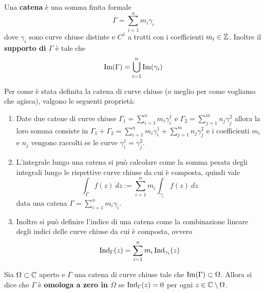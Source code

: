 \begin{definition}
    \label{def:catena-di-curve-chiuse}
    Una \textbf{catena} è una somma finita formale 
    \begin{equation*}
      \Gamma = \sum^n_{i=1} m_i \gamma_i
    \end{equation*}
    dove $\gamma_i$ sono curve chiuse distinte e $C^1$ a tratti con
    i coefficienti $m_i \in \mathbb{Z}$. Inoltre il \textbf{supporto di $\Gamma$}
    è tale che 
    \begin{equation*}
      \operatorname{Im}(\Gamma) = \bigcup^n_{i=1} \operatorname{Im}(\gamma_i)
    \end{equation*}
\end{definition}

\begin{remark}
  Per come è stata definita la catena di curve chiuse (o meglio per come vogliamo
  che agisca), valgono le seguenti proprietà:
  \begin{enumerate}
    \item Date due catene di curve chiuse $\Gamma_1 = \sum^n_{i=1} m_i
      \gamma^1_i$ e $\Gamma_2 = \sum^m_{j=1} n_j \gamma^2_j$ allora la loro
      somma consiste in $\Gamma_1 + \Gamma_2 =  \sum^n_{i=1} m_i
      \gamma^1_i + \sum^m_{j=1} n_j \gamma^2_j$ e i coefficienti $m_i$
      e $n_j$ vengono raccolti se le curve $\gamma^1_i = \gamma^2_j$.
    \item L'integrale lungo una catena si può calcolare come la somma pesata
      degli integrali lungo le rispettive curve chiuse da cui è composta,
      quindi vale 
      \begin{equation*}
        \int_\Gamma f(z)\ dz := \sum^n_{i=1} m_i \int_{\gamma_i} f(z)\ dz
      \end{equation*}
      data una catena $\Gamma = \sum^n_{i=1} m_i\gamma_i$.
    \item Inoltre si può definire l'indice di una catena come la
      combinazione lineare degli indici delle curve chiuse da cui
      è composta, ovvero 
      \begin{equation*}
        \operatorname{Ind}_\Gamma(z) = \sum^n_{i=1} m_i
        \operatorname{Ind}_{\gamma_i}(z)
      \end{equation*}
  \end{enumerate}
  \label{rmk:operazioni-intuitive-per-le-catene-di-curve-chiuse}
\end{remark}


\begin{definition}
  \label{def:omologia-a-zero}
  Sia $\Omega \subset \mathbb{C}$ aperto e $\Gamma$ una catena di curve chiuse tale
  che $\operatorname{Im}(\Gamma) \subset \Omega$. Allora si dice che $\Gamma$
  è \textbf{omologa a zero in $\Omega$} se $\operatorname{Ind}_\Gamma(z)
  = 0$ per ogni $z \in \mathbb{C} \setminus \Omega$. 
\end{definition}

